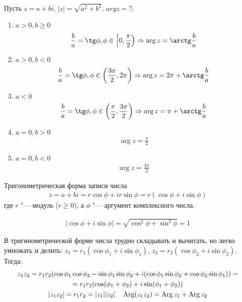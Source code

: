 Пусть $z = a + bi$, $|z| = \sqrt{a^2 + b^2}$. $arg z = ?$:
\begin{enumerate}
\item $a > 0, b \ge 0$ 
\begin{gather*}
\frac{b}{a} = \tg \phi, \phi \in \left[0, \frac{\pi}2\right) \Ra \arg z = \arctg \frac{b}{a}
\end{gather*}
\item $a > 0, b < 0$ 
\begin{gather*}
\frac{b}{a} = \tg \phi, \phi \in \left(\frac{3\pi}2, 2\pi\right) \Ra \arg z = 2\pi + \arctg \frac{b}{a}
\end{gather*}
\item $a < 0$ 
\begin{gather*}
\frac{b}{a} = \tg \phi, \phi \in \left(\frac{\pi}2, \frac{3\pi}2\right) \Ra \arg z = \pi + \arctg \frac{b}{a}
\end{gather*}
\item $a = 0, b > 0$
\begin{gather*}
\arg z = \frac\pi2
\end{gather*}
\item $a = 0, b < 0$
\begin{gather*}
\arg z = \frac{3\pi}2
\end{gather*}
\end{enumerate}

\begin{Def}{Тригонометрическая форма записи числа}
\begin{gather*}
z = a + bi = r\cos \phi + ir\sin \phi = r(\cos \phi + i\sin \phi)
\end{gather*}
где $r$ "--- модуль ($r \ge 0$), а $\phi$ "--- аргумент комплексного числа.
\end{Def}
\begin{gather*}
|\cos \phi + i \sin \phi| = \sqrt{\cos^2 \phi + \sin^2 \phi} = 1
\end{gather*}

В тригинометрической форме числа трудно складывать и вычитать, но легко умножать и делить: 
$z_1 = r_1(\cos \phi_1 + i \sin \phi_1)$, $z_2 = r_2(\cos \phi_2 + i \sin \phi_2)$. Тогда:
\begin{gather*}
z_1z_2 = r_1r_2(\cos \phi_1 \cos \phi_2 - \sin \phi_1 \sin \phi_2 + i(\cos \phi_1 \sin \phi_2 + \cos \phi_2 \sin \phi_1)) = \\
= r_1r_2(\cos(\phi_1 + \phi_2) + i \sin(\phi_1 + \phi_2)) \\
|z_1z_2| = r_1r_2 = |z_1||z_2| \quad \operatorname{Arg} (z_1z_2) = \operatorname{Arg} z_1 + \operatorname{Arg} z_2
\end{gather*}
